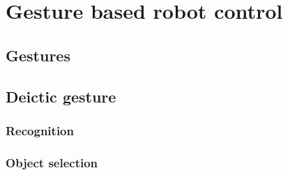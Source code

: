 \chapter{Gesture based robot control}

\section{Gestures}

\section{Deictic gesture}

\subsection{Recognition}
\subsection{Object selection}